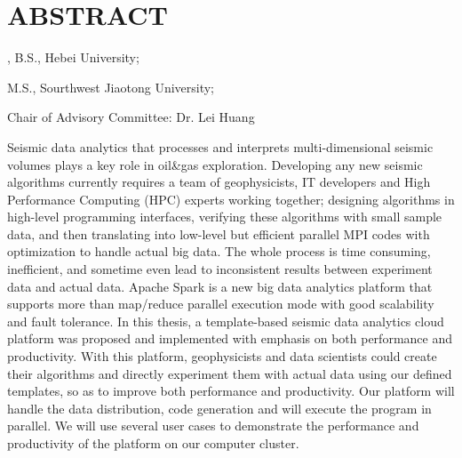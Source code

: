 %
%
%

\chapter*{ABSTRACT}

\pagestyle{plain} %
\setcounter{page}{2}

\begin{center}
\pvamumanuscripttitle

\pvamugradmonth \hspace{2pt} \pvamugradyear

\pvamufullname, B.S., Hebei University;

M.S., Sourthwest Jiaotong University;

Chair of Advisory Committee: Dr. Lei Huang 

\par\end{center}

\indent Seismic data analytics that processes and interprets multi-dimensional seismic volumes plays a key role in oil\&gas exploration. Developing any new seismic algorithms currently requires a team of geophysicists, IT developers and High Performance Computing (HPC) experts working together; designing algorithms in high-level programming interfaces, verifying these algorithms with small sample data, and then translating into low-level but efficient parallel MPI codes with optimization to handle actual big data. The whole process is time consuming, inefficient, and sometime even lead to inconsistent results between experiment data and actual data. Apache Spark is a new big data analytics platform that supports more than map/reduce parallel execution mode with good scalability and fault tolerance. In this thesis, a template-based seismic data analytics cloud platform was proposed and implemented with emphasis on both performance and productivity. With this platform, geophysicists and data scientists could create their algorithms and directly experiment them with actual data using our defined templates, so as to improve both performance and productivity. Our platform will handle the data distribution, code generation and will execute the program in parallel. We will use several user cases to demonstrate the performance and productivity of the platform on our computer cluster.  


 

\pagebreak{}
